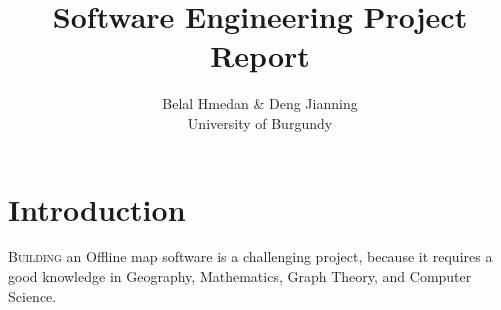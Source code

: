 \documentclass[a4paper, 12pt, english]{book}
\title{\textbf{Software Engineering Project Report}}
\begin{document}
\author{Belal Hmedan \& Deng Jianning\\University of Burgundy}
\maketitle
\let\cleardoublepage\clearpage
\tableofcontents
\chapter*{Introduction}
 
\lettrine{B}{uilding} an Offline map software is a challenging project, 
because it requires a good knowledge in Geography, Mathematics, 
Graph Theory, and Computer Science.\\
\end{document}
